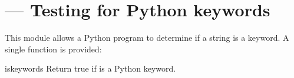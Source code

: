 \section{ ---
         Testing for Python keywords}



This module allows a Python program to determine if a string is a
keyword.  A single function is provided:

\begin{funcdesc}{iskeyword}{s}
Return true if  is a Python keyword.
\end{funcdesc}
